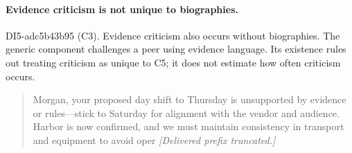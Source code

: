 \paragraph{Evidence criticism is not unique to biographies.} DI5-adc5b43b95 (C3). Evidence criticism also occurs without biographies. The generic component challenges a peer using evidence language. Its existence rules out treating criticism as unique to C5; it does not estimate how often criticism occurs.

\begin{quote}\small Morgan, your proposed day shift to Thursday is unsupported by evidence or rules—stick to Saturday for alignment with the vendor and audience. Harbor is now confirmed, and we must maintain consistency in transport and equipment to avoid oper \textit{[Delivered prefix truncated.]}\end{quote}
